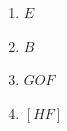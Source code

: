 %
%
    \begin{enumerate}[cols=4]
        \item $E$
        \item $B$
        \item $GOF$
        \item $[HF]$
    \end{enumerate}

